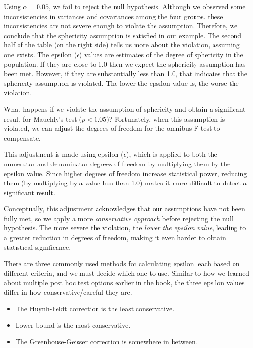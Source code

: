 \documentclass[
  letterpaper,
  DIV=11,
  numbers=noendperiod]{scrreprt}
\begin{document}
Using \(\alpha = 0.05\), we fail to reject the null hypothesis. Although
we observed some inconsistencies in variances and covariances among the
four groups, these inconsistencies are not severe enough to violate the
assumption. Therefore, we conclude that the sphericity assumption is
satisfied in our example. The second half of the table (on the right
side) tells us more about the violation, assuming one exists. The
epsilon (\(\epsilon\)) values are estimates of the degree of sphericity
in the population. If they are close to 1.0 then we expect the
sphericity assumption has been met. However, if they are substantially
less than 1.0, that indicates that the sphericity assumption is
violated. The lower the epsilon value is, the worse the violation.

What happens if we violate the assumption of sphericity and obtain a
significant result for Mauchly's test (\(p < 0.05\))? Fortunately, when
this assumption is violated, we can adjust the degrees of freedom for
the omnibus F test to compensate.

This adjustment is made using epsilon (\(\epsilon\)), which is applied
to both the numerator and denominator degrees of freedom by multiplying
them by the epsilon value. Since higher degrees of freedom increase
statistical power, reducing them (by multiplying by a value less than
1.0) makes it more difficult to detect a significant result.

Conceptually, this adjustment acknowledges that our assumptions have not
been fully met, so we apply a more \emph{conservative approach} before
rejecting the null hypothesis. The more severe the violation, the
\emph{lower the epsilon value}, leading to a greater reduction in
degrees of freedom, making it even harder to obtain statistical
significance.

There are three commonly used methods for calculating epsilon, each
based on different criteria, and we must decide which one to use.
Similar to how we learned about multiple post hoc test options earlier
in the book, the three epsilon values differ in how conservative/careful
they are.

\begin{itemize}
\item
  The Huynh-Feldt correction is the least conservative.
\item
  Lower-bound is the most conservative.
\item
  The Greenhouse-Geisser correction is somewhere in between.
\end{itemize}
\end{document}
